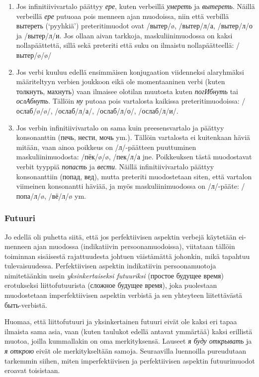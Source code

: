 \documentclass[]{scrartcl}
\providecommand{\tightlist}{%
  \setlength{\itemsep}{0pt}\setlength{\parskip}{0pt}}
\begin{document}
\begin{enumerate}
\def\labelenumi{\arabic{enumi}.}
\tightlist
\item
  Jos infinitiivivartalo päättyy \emph{ере}, kuten verbeillä
  \emph{умереть} ja \emph{вытереть}. Näillä verbeillä \emph{ере} putuoaa
  pois menneen ajan muodoissa, niin että verbillä вытереть (`pyyhkiä')
  preteritimuodot ovat /вытер/ø, /вытер/л/а, /вытер/л/о ja /вытер/л/и.
  Jos ollaan aivan tarkkoja, maskuliinimuodossa on kaksi nollapäättettä,
  sillä sekä preteriti että suku on ilmaistu nollapäätteellä:
  /вытер/ø/ø/
\item
  Jos verbi kuuluu edellä ensimmäisen konjugaation viidenneksi
  alaryhmäksi määriteltyyn verbien joukkoon eikä ole momentaaninen verbi
  (kuten толкнуть, махнуть) vaan ilmaisee olotilan muutosta kuten
  \emph{погИбнуть} tai \emph{ослАбнуть}. Tällöin \emph{ну} putoaa pois
  vartalosta kaikissa preteritimuodoissa: /ослаб/ø/ø/, /ослаб/л/а/,
  /ослаб/л/о/, /ослаб/л/и/.
\item
  Jos verbin infinitiivivartalo on sama kuin preesensvartalo ja päättyy
  konsonanttin (печь, нести, мочь ym.). Tällöin vartalosta ei kuitenkaan
  häviä mitään, vaan ainoa poikkeus on /л/-päätteen puuttuminen
  maskuliinimuodosta: /пёк/ø/ø, /пек/л/а jne. Poikkeuksen tästä
  muodostavat verbit tyyppiä \emph{попасть} ja \emph{вести}. Näillä
  infinitiivivartalo päättyy konsonanttiin (попад, вед), mutta preteriti
  muodostetaan siten, että vartalon viimeinen konsonantti häviää, ja
  myös maskuliinimuodossa on /л/-pääte: /попа/л/ø, /вё/л/ø ym.
\end{enumerate}

\subsubsection{Futuuri}\label{futuuri}

Jo edellä oli puhetta siitä, että jos perfektiivisen aspektin verbejä
käytetään ei-menneen ajan muodossa (indikatiivin persoonamuodoissa),
viitataan tällöin toiminnan sisäisestä rajattuudesta johtuen väistämättä
johonkin, mikä tapahtuu tulevaisuudessa. Perfektiivisen aspektin
indikatiivin persoonamuotoja nimitetäänkin usein \emph{yksinkertaiseksi
futuuriksi} (простое будущее время) erotukseksi liittofutuurista
(сложное будущее время), joka puolestaan muodostetaan imperfektiivisen
aspektin verbistä ja sen yhteyteen liitettävästä быть-verbistä.

Huomaa, että liittofutuuri ja yksinkertainen futuuri eivät ole kaksi eri
tapaa ilmaista sama asia, vaan (kuten taulukot edellä antavat ymmärtää)
kaksi erillistä muotoa, joilla kummallakin on oma merkityksensä. Lauseet
\emph{я буду открывать} ja \emph{я открою} eivät ole merkitykseltään
samoja. Seuraavilla luennoilla pureudutaan tarkemmin siihen, miten
imperfektiivisen ja perfektiivisen aspektin futuurimuodot eroavat
toisistaan.
\end{document}
